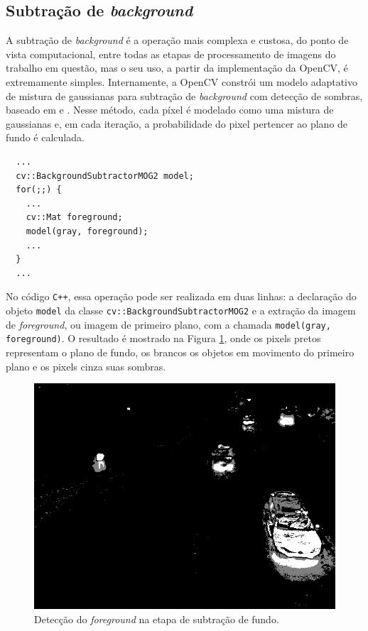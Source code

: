 
\subsection{Subtração de \textit{background}} %
\label{sub:subtra_o_de_background}

A subtração de \textit{background} é a operação mais complexa e custosa, do ponto de vista computacional, entre todas as etapas de processamento de imagens do trabalho em questão, mas o seu uso, a partir da implementação da OpenCV, é extremamente simples. Internamente, a OpenCV constrói um modelo adaptativo de mistura de gaussianas para subtração de \textit{background} com detecção de sombras, baseado em \cite{zivkovic:2004} e \cite{zivkovic:2006}. Nesse método, cada píxel é modelado como uma mistura de gaussianas e, em cada iteração, a probabilidade do pixel pertencer ao plano de fundo é calculada.

\begin{lstlisting}
  ...
  cv::BackgroundSubtractorMOG2 model;
  for(;;) {
    ...
    cv::Mat foreground;
    model(gray, foreground);
    ...
  }
  ...
\end{lstlisting}

No código \verb!C++!, essa operação pode ser realizada em duas linhas: a declaração do objeto \verb!model! da classe \verb!cv::BackgroundSubtractorMOG2! e a extração da imagem de \textit{foreground}, ou imagem de primeiro plano, com a chamada \verb!model(gray, foreground)!. O resultado é mostrado na Figura \ref{fig:foreground}, onde os pixels pretos representam o plano de fundo, os brancos os objetos em movimento do primeiro plano e os pixels cinza suas sombras.

\begin{figure}[ht]
  \begin{center}
    \includegraphics[scale=0.5]{imgs/foreground.png}
  \end{center}
  \caption{Detecção do \textit{foreground} na etapa de subtração de fundo.}
  \label{fig:foreground}
\end{figure}

